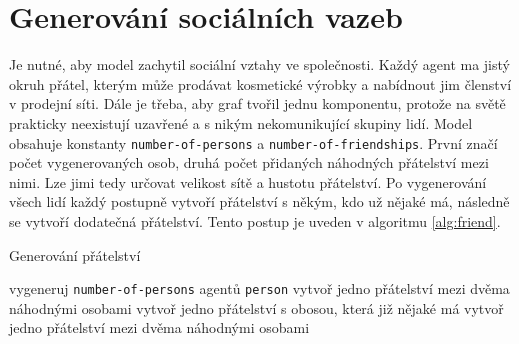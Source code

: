 \documentclass[a4wide,12pt]{report}
\begin{document}
\section{Generování sociálních vazeb}
Je nutné, aby model zachytil sociální vztahy ve společnosti. Každý agent ma jistý okruh přátel, kterým může prodávat kosmetické výrobky a nabídnout jim členství v prodejní síti. Dále je třeba, aby graf tvořil jednu komponentu, protože na světě prakticky neexistují uzavřené a s nikým nekomunikující skupiny lidí. Model obsahuje konstanty \texttt{number-of-persons} a \texttt{number-of-friendships}. První značí počet vygenerovaných osob, druhá počet přidaných náhodných přátelství mezi nimi. Lze jimi tedy určovat velikost sítě a hustotu přátelství. Po vygenerování všech lidí každý postupně vytvoří přátelství s někým, kdo už nějaké má, následně se vytvoří dodatečná přátelství. Tento postup je uveden v algoritmu \ref{alg:friend}.
\begin{algorithm}
\caption{Generování přátelství}
\label{alg:friend}
\begin{algorithmic}
\STATE vygeneruj \texttt{number-of-persons} agentů \texttt{person}
\STATE vytvoř jedno přátelství mezi dvěma náhodnými osobami
  \STATE vytvoř jedno přátelství s obosou, která již nějaké má
\ENDFOR
{}
  \STATE vytvoř jedno přátelství mezi dvěma náhodnými osobami
\ENDFOR
\end{algorithmic}
\end{algorithm}
\end{document}
